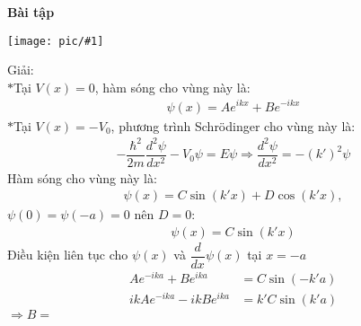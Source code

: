 \documentclass{report}
\newcommand{\image}[1]{
	\begin{center}
		\texttt{[image: pic/\#1]}
	\end{center}
}
\newcommand{\f}[2]{\dfrac{#1}{#2}}
\begin{document}
\textbf{Bài tập}
\image{prob10_5.png}
Giải:\\
$\ast$Tại $V(x) = 0$, hàm sóng cho vùng này là:
\begin{align*}
	\psi(x) = A e^{ikx} + B e^{-ikx}
\end{align*}
$\ast$Tại $V(x) = -V_0$, phương trình Schr\"{o}dinger cho vùng này là:
\begin{align*}
	-\f{\hbar^2}{2m}\f{d^2\psi}{dx^2} - V_0 \psi = E\psi \Rightarrow \f{d^2\psi}{dx^2} = -(k')^2\psi
\end{align*}
Hàm sóng cho vùng này là:
\begin{align*}
	\psi(x) = C \sin(k'x) + D\cos(k'x),
\end{align*}
$\psi (0) = \psi (-a) = 0$ nên $D = 0$:
\begin{align*}
	\psi(x) = C \sin(k'x)
\end{align*}
Điều kiện liên tục cho $\psi(x)$ và $\f{d}{dx}\psi(x)$ tại $x= - a$
\begin{align*}
	 A e^{-ika} + B e^{ika} & = C \sin(-k'a) \\ 
	 ik A e^{-ika} -  ik B e^{ika} & = k' C \sin(k'a)
\end{align*}
$\Rightarrow B = $
\end{document}
